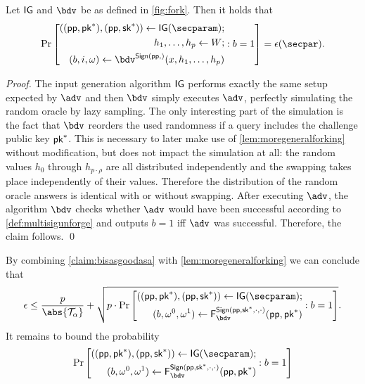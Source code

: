 \begin{claim}\label{claim:bisasgoodasa}
  Let $\mathsf{IG}$ and $\bdv$ be as defined in \autoref{fig:fork}. Then it holds that
  \[\Pr\left[\begin{aligned}((\params,\pk^*),(\params,\sk^*)) \gets \IG(\secparam);\\ h_1,\dots,h_{p}\gets W;\\ (b,i,%
  \omega) \gets \bdv^{\sign(\params,)}(x,h_1,\dots,h_{p})\end{aligned} : b = 1\right] = \epsilon(\secpar).\]
\end{claim}
\begin{proof}
  The input generation algorithm $\mathsf{IG}$ performs exactly the same setup expected by $\adv$ and then $\bdv$ simply executes $\adv$, perfectly simulating the random oracle by lazy sampling. The only interesting part of the simulation is the fact that $\bdv$ reorders the used randomness if a query includes the challenge public key $\mathsf{pk}^*$.
  This is necessary to later make use of \autoref{lem:moregeneralforking} without modification, but does not impact the simulation at all: the random values $h_0$ through $h_{p\cdot\rho}$ are all distributed independently and the swapping takes place independently of their values. Therefore the distribution of the random oracle answers is identical with or without swapping.
  After executing $\adv$, the algorithm $\bdv$ checks whether $\adv$ would have been successful according to \autoref{def:multisigunforge} and outputs $b=1$ iff $\adv$ was successful. Therefore, the claim follows. \qed
\end{proof}
  
  By combining \autoref{claim:bisasgoodasa} with \autoref{lem:moregeneralforking} we can conclude that
  \begin{equation}
    \epsilon \leq \frac{p}{\abs{\tern_\alpha}} + \sqrt{p\cdot\Pr\left[\begin{aligned}((\params,\pk^*),(\params,\sk^*)) \gets \IG(\secparam);\\ (b,\omega^0,\omega^1)\gets \fork^{\sign(\params,\sk^*,\cdot,\cdot)}_\bdv(\params,\pk^*)\end{aligned} : b=1 \right]}.\label{eq:forkingresult}
  \end{equation}
  It remains to bound the probability
  \[
    \Pr\left[\begin{aligned}((\params,\pk^*),(\params,\sk^*)) \gets \IG(\secparam);\\ (b,\omega^0,\omega^1)\gets \fork^{\sign(\params,\sk^*,\cdot,\cdot)}_\bdv(\params,\pk^*)\end{aligned} : b=1 \right]
  \]
  
